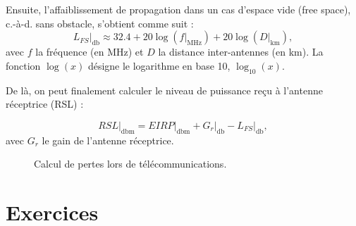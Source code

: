 \documentclass [a4paper, 11pt] {article}
\begin{document}
    Ensuite, l'affaiblissement de propagation dans un cas d'espace vide (free space), c.-à-d. sans obstacle, s'obtient comme suit :
    \begin{equation}
        L_{FS}\Big|_{\si{\decibel}} \approx 32.4 + 20 \log(f\Big|_{\si{\mega\hertz}}) + 20 \log(D\Big|_{\si{\kilo\meter}}),
    \end{equation}
    avec $f$ la fréquence (en \si{\mega\hertz}) et $D$ la distance inter-antennes (en \si{\kilo\meter}). La fonction $\log(x)$ désigne le logarithme en base 10, $\log_{10}(x)$.
    
    De là, on peut finalement calculer le niveau de puissance reçu à l'antenne réceptrice (RSL) :
    
    \begin{equation}
        RSL\Big|_{\si{\decibel\meter}} = EIRP\Big|_{\si{\decibel\meter}} + G_r\Big|_{\si{\decibel}} - L_{FS}\Big|_{\si{\decibel}},
    \end{equation}
    avec $G_r$ le gain de l'antenne réceptrice.
    
    \begin{figure}[H]
            \centering
            \caption{Calcul de pertes lors de télécommunications.}
            \label{fig:radio_losses}
        \end{figure}
    
    \pagebreak
    \part*{Exercices}
    
\end{document}
